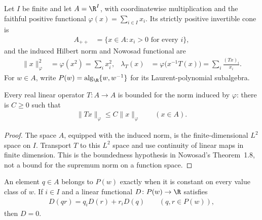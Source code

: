 \begin{definition}
    \label{def:nowosad_finite_coordinate_data}
    \leanok
    Let $I$ be finite and let $A=\R^I$, with coordinatewise multiplication
    and the faithful positive functional $\varphi(x)=\sum_{i\in I}x_i$.  Its
    strictly positive invertible cone is
    \begin{align}
        A_{++}&=\{x\in A:x_i>0\text{ for every }i\},
    \end{align}
    and the induced Hilbert norm and Nowosad functional are
    \begin{align}
        \lVert x\rVert_\varphi^2&=\varphi(x^2)=\sum_i x_i^2,
        &\lambda_T(x)&=\varphi\bigl(x^{-1}T(x)\bigr)
          =\sum_i\frac{(Tx)_i}{x_i}.
    \end{align}
    For $w\in A$, write
    $P(w)=\operatorname{alg}_{\R}\{w,w^{-1}\}$ for its Laurent-polynomial
    subalgebra.
\end{definition}

\begin{theorem}
    \label{thm:nowosad_finite_hilbert_bound}
    \leanok
    Every real linear operator $T\colon A\to A$ is bounded for the norm
    induced by $\varphi$: there is $C\ge0$ such that
    \begin{align}
        \lVert Tx\rVert_\varphi\le C\lVert x\rVert_\varphi
        \qquad (x\in A).
    \end{align}
\end{theorem}

\begin{proof}
    \leanok
    The space $A$, equipped with the induced norm, is the finite-dimensional
    $L^2$ space on $I$.  Transport $T$ to this $L^2$ space and use continuity
    of linear maps in finite dimension.  This is the boundedness hypothesis
    in Nowosad's Theorem~1.8, not a bound for the supremum norm on a function
    space.
\end{proof}

\begin{theorem}
    \label{thm:nowosad_finite_laurent_derivation}
    \leanok
    An element $q\in A$ belongs to $P(w)$ exactly when it is constant on
    every value class of $w$.  If $i\in I$ and a linear functional
    $D\colon P(w)\to\R$ satisfies
    \begin{align}
        D(qr)=q_iD(r)+r_iD(q)
        \qquad (q,r\in P(w)),
    \end{align}
    then $D=0$.
\end{theorem}

